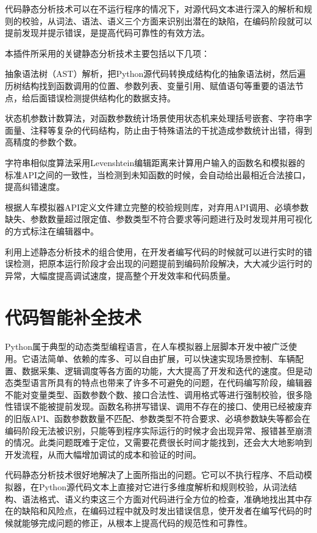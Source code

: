 代码静态分析技术可以在不运行程序的情况下，对源代码文本进行深入的解析和规则的校验，从词法、语法、语义三个方面来识别出潜在的缺陷，在编码阶段就可以提前发现并提示错误，是提高代码可靠性的有效方法。

本插件所采用的关键静态分析技术主要包括以下几项：

抽象语法树（AST）解析，把Python源代码转换成结构化的抽象语法树，然后遍历树结构找到函数调用的位置、参数列表、变量引用、赋值语句等重要的语法节点，给后面错误检测提供结构化的数据支持。

状态机参数计数算法，对函数参数统计场景使用状态机来处理括号嵌套、字符串字面量、注释等复杂的代码结构，防止由于特殊语法的干扰造成参数统计出错，得到高精度的参数个数。

字符串相似度算法采用Levenshtein编辑距离来计算用户输入的函数名和模拟器的标准API之间的一致性，当检测到未知函数的时候，会自动给出最相近合法接口，提高纠错速度。

根据人车模拟器API定义文件建立完整的校验规则库，对弃用API调用、必填参数缺失、参数数量超过限定值、参数类型不符合要求等问题进行及时发现并用可视化的方式标注在编辑器中。

利用上述静态分析技术的组合使用，在开发者编写代码的时候就可以进行实时的错误检测，把原本运行阶段才会出现的问题提前到编码阶段解决，大大减少运行时的异常，大幅度提高调试速度，提高整个开发效率和代码质量。

\section{代码智能补全技术}

Python属于典型的动态类型编程语言，在人车模拟器上层脚本开发中被广泛使用。它语法简单、依赖的库多、可以自由扩展，可以快速实现场景控制、车辆配置、数据采集、逻辑调度等各方面的功能，大大提高了开发和迭代的速度。但是动态类型语言所具有的特点也带来了许多不可避免的问题，在代码编写阶段，编辑器不能对变量类型、函数参数个数、接口合法性、调用格式等进行强制校验，很多隐性错误不能被提前发现。函数名称拼写错误、调用不存在的接口、使用已经被废弃的旧版API、函数参数数量不匹配、参数类型不符合要求、必填参数缺失等都会在编码阶段无法被识别，只能等到程序实际运行的时候才会出现异常、报错甚至崩溃的情况。此类问题既难于定位，又需要花费很长时间才能找到，还会大大地影响到开发流程，从而大幅增加调试的成本和验证的时间。

代码静态分析技术很好地解决了上面所指出的问题。它可以不执行程序、不启动模拟器，在Python源代码文本上直接对它进行多维度解析和规则校验，从词法结构、语法格式、语义约束这三个方面对代码进行全方位的检查，准确地找出其中存在的缺陷和风险点，在编码过程中就及时发出错误信息，使开发者在编写代码的时候就能够完成问题的修正，从根本上提高代码的规范性和可靠性。

